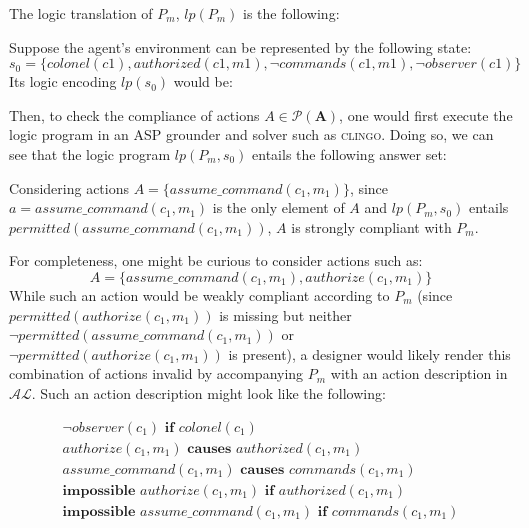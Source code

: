 The logic translation of $P_m$, $lp(P_m)$ is the following:


Suppose the agent's environment can be represented by the following state:
\begin{equation}
    s_0 = \{colonel(c1), authorized(c1,m1), \neg commands(c1,m1), \neg observer(c1) \}
\end{equation}
Its logic encoding $lp(s_0)$ would be:


Then, to check the compliance of actions $A \in \mathcal{P}(\boldsymbol{A})$, one would first execute the logic program in an ASP grounder and solver such as \textsc{clingo}\footnotemark.
Doing so, we can see that the logic program $lp(P_m, s_0)$ entails the following answer set:



Considering actions $A=\{assume\_command(c_1, m_1)\}$, since $a = assume\_command(c_1, m_1)$ is the only element of $A$ and $lp(P_m, s_0)$ entails $permitted(assume\_command(c_1, m_1))$, $A$ is strongly compliant with $P_m$.

For completeness, one might be curious to consider actions such as:
\begin{equation}
    A = \{assume\_command(c_1, m_1), authorize(c_1, m_1)\}
\end{equation}
While such an action would be weakly compliant according to $P_m$ (since $permitted(authorize(c_1, m_1))$ is missing but neither $\neg permitted(assume\_command(c_1, m_1))$ or $\neg permitted(authorize(c_1, m_1))$ is present), a designer would likely render this combination of actions invalid by accompanying $P_m$ with an action description in $\mathcal{AL}$.
Such an action description might look like the following:

\begin{gather}
    \neg observer(c_1) \textbf{ if } colonel(c_1) \label{eq:apl_action_description_5} \\
    authorize(c_1, m_1) \textbf{ causes } authorized(c_1, m_1) \label{eq:apl_action_description_1} \\
    assume\_command(c_1, m_1) \textbf{ causes } commands(c_1, m_1) \label{eq:apl_action_description_2} \\
    \textbf{impossible } authorize(c_1, m_1) \textbf{ if } authorized(c_1, m_1) \label{eq:apl_action_description_3} \\
    \textbf{impossible } assume\_command(c_1, m_1) \textbf{ if } commands(c_1, m_1) \label{eq:apl_action_description_4}
\end{gather}

